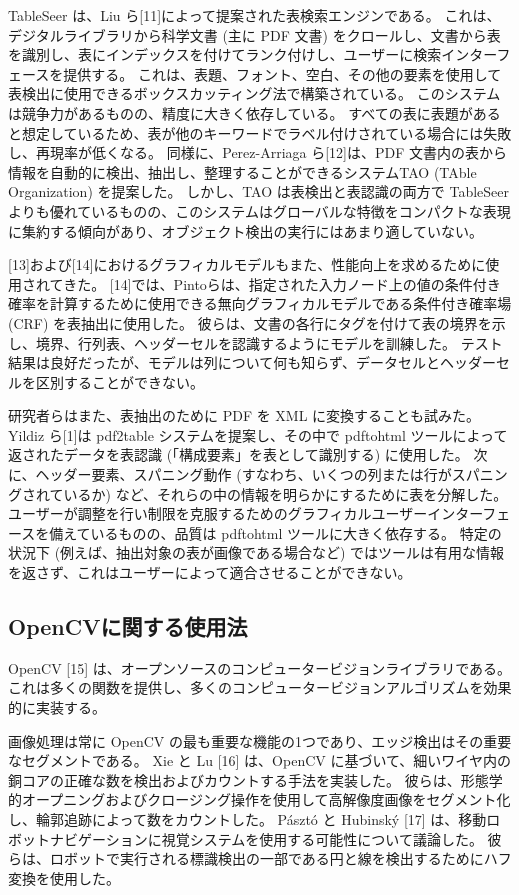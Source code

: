 \documentclass[uplatex, twocolumn,10pt]{jsarticle}
\begin{document}
TableSeer は、Liu ら[11]によって提案された表検索エンジンである。
これは、デジタルライブラリから科学文書 (主に PDF 文書) をクロールし、文書から表を識別し、表にインデックスを付けてランク付けし、ユーザーに検索インターフェースを提供する。
これは、表題、フォント、空白、その他の要素を使用して表検出に使用できるボックスカッティング法で構築されている。
このシステムは競争力があるものの、精度に大きく依存している。
すべての表に表題があると想定しているため、表が他のキーワードでラベル付けされている場合には失敗し、再現率が低くなる。
同様に、Perez-Arriaga ら[12]は、PDF 文書内の表から情報を自動的に検出、抽出し、整理することができるシステムTAO (TAble Organization) を提案した。
しかし、TAO は表検出と表認識の両方で TableSeer よりも優れているものの、このシステムはグローバルな特徴をコンパクトな表現に集約する傾向があり、オブジェクト検出の実行にはあまり適していない。

[13]および[14]におけるグラフィカルモデルもまた、性能向上を求めるために使用されてきた。
[14]では、Pintoらは、指定された入力ノード上の値の条件付き確率を計算するために使用できる無向グラフィカルモデルである条件付き確率場 (CRF) を表抽出に使用した。
彼らは、文書の各行にタグを付けて表の境界を示し、境界、行列表、ヘッダーセルを認識するようにモデルを訓練した。
テスト結果は良好だったが、モデルは列について何も知らず、データセルとヘッダーセルを区別することができない。

研究者らはまた、表抽出のために PDF を XML に変換することも試みた。
Yildiz ら[1]は pdf2table システムを提案し、その中で pdftohtml ツールによって返されたデータを表認識 (「構成要素」を表として識別する) に使用した。
次に、ヘッダー要素、スパニング動作 (すなわち、いくつの列または行がスパニングされているか) など、それらの中の情報を明らかにするために表を分解した。
ユーザーが調整を行い制限を克服するためのグラフィカルユーザーインターフェースを備えているものの、品質は pdftohtml ツールに大きく依存する。
特定の状況下 (例えば、抽出対象の表が画像である場合など) ではツールは有用な情報を返さず、これはユーザーによって適合させることができない。

\subsection{OpenCVに関する使用法}
OpenCV [15] は、オープンソースのコンピュータービジョンライブラリである。
これは多くの関数を提供し、多くのコンピュータービジョンアルゴリズムを効果的に実装する。

画像処理は常に OpenCV の最も重要な機能の1つであり、エッジ検出はその重要なセグメントである。
Xie と Lu [16] は、OpenCV に基づいて、細いワイヤ内の銅コアの正確な数を検出およびカウントする手法を実装した。
彼らは、形態学的オープニングおよびクロージング操作を使用して高解像度画像をセグメント化し、輪郭追跡によって数をカウントした。
Pásztó と Hubinský [17] は、移動ロボットナビゲーションに視覚システムを使用する可能性について議論した。
彼らは、ロボットで実行される標識検出の一部である円と線を検出するためにハフ変換を使用した。
\end{document}
